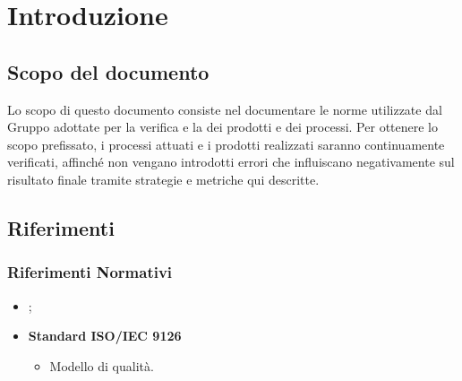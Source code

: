 \documentclass[PianoDiQualifica.tex]{subfiles}
\begin{document}
\chapter{Introduzione}

	\section{Scopo del documento}
	Lo scopo di questo documento consiste nel documentare le norme utilizzate dal Gruppo \gruppo adottate per la verifica e la  dei prodotti e dei processi. Per ottenere lo scopo prefissato, i processi attuati e i prodotti realizzati saranno continuamente verificati, affinché non vengano introdotti errori che influiscano negativamente sul risultato finale tramite strategie e metriche qui descritte.
	
	\scopoProdotto
	
	\glossExpl
	
	\section{Riferimenti}
		\subsection{Riferimenti Normativi}
		\begin{itemize}
			\item \textbf{\ndp \vruno};
			\item \textbf{Standard ISO/IEC 9126}\\
			\begin{itemize}
				\item Modello di qualità.
			\end{itemize}
		\end{itemize}
		
\end{document}
